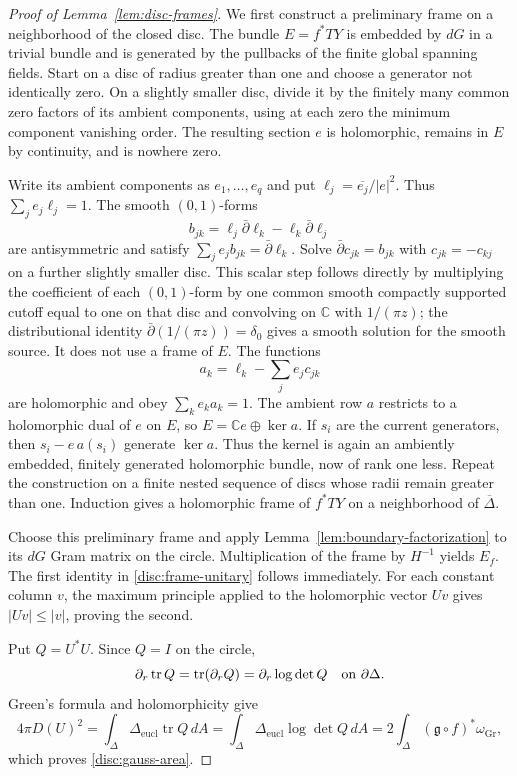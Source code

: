 \documentclass[11pt]{article}
\theoremstyle{definition}
\theoremstyle{remark}
\newcommand{\C}{\mathbb C}
\newcommand{\dbar}{\bar\partial}
\DeclareMathOperator{\tr}{tr}
\DeclareMathOperator{\Gr}{Gr}
\numberwithin{equation}{section}
\begin{document}
\begin{proof}[Proof of Lemma~\ref{lem:disc-frames}]
We first construct a preliminary frame on a neighborhood of the closed
disc.  The bundle $E=f^*TY$ is embedded by $dG$ in a trivial bundle
and is generated by the pullbacks of the finite global spanning
fields.  Start on a disc of radius greater than one and choose a
generator not identically zero.  On a slightly smaller disc, divide
it by the finitely many common zero factors of its ambient
components, using at each zero the minimum component vanishing
order.  The resulting section $e$ is holomorphic, remains in $E$ by
continuity, and is nowhere zero.

Write its ambient components as $e_1,\ldots,e_q$ and put
$\ell_j=\overline{e_j}/|e|^2$.  Thus $\sum_j e_j\ell_j=1$.
The smooth $(0,1)$-forms
\[
 b_{jk}=\ell_j\dbar\ell_k-\ell_k\dbar\ell_j
\]
are antisymmetric and satisfy
$\sum_j e_jb_{jk}=\dbar\ell_k$.
Solve $\dbar c_{jk}=b_{jk}$ with $c_{jk}=-c_{kj}$ on a further
slightly smaller disc.  This scalar step follows directly by
multiplying the coefficient of each $(0,1)$-form by one common smooth
compactly supported cutoff equal to one on that disc and convolving
on $\C$ with $1/(\pi z)$;
the distributional identity
$\dbar(1/(\pi z))=\delta_0$ gives a smooth solution for the smooth
source.  It does not use a frame of $E$.
The functions
\[
 a_k=\ell_k-\sum_j e_jc_{jk}
\]
are holomorphic and obey $\sum_k e_ka_k=1$.
The ambient row $a$ restricts to a holomorphic dual of $e$ on $E$,
so $E=\C e\oplus\ker a$.  If $s_i$ are the current generators,
then $s_i-e\,a(s_i)$ generate $\ker a$.
Thus the kernel is again an ambiently embedded, finitely generated
holomorphic bundle, now of rank one less.  Repeat the construction
on a finite nested sequence of discs whose radii remain greater
than one.  Induction gives a holomorphic frame of $f^*TY$ on a
neighborhood of $\overline\Delta$.

Choose this preliminary frame and apply
Lemma~\ref{lem:boundary-factorization} to its $dG$ Gram matrix on
the circle.  Multiplication of the frame by $H^{-1}$ yields $E_f$.
The first identity in \eqref{disc:frame-unitary} follows immediately.
For each constant column $v$, the maximum principle applied to the
holomorphic vector $Uv$ gives $|Uv|\le|v|$, proving the second.

Put $Q=U^*U$.  Since $Q=I$ on the circle,
\[
 \partial_r\tr Q=\tr(\partial_rQ)
                =\partial_r\log\det Q
 \quad\hbox{on }\partial\Delta.
\]
Green's formula and holomorphicity give
\[
 4\pi D(U)^2
 =\int_\Delta\Delta_{\mathrm{eucl}}\tr Q\,dA
 =\int_\Delta\Delta_{\mathrm{eucl}}\log\det Q\,dA
 =2\int_\Delta(\mathfrak g\circ f)^*\omega_{\Gr},
\]
which proves \eqref{disc:gauss-area}.


\end{proof}
\end{document}
